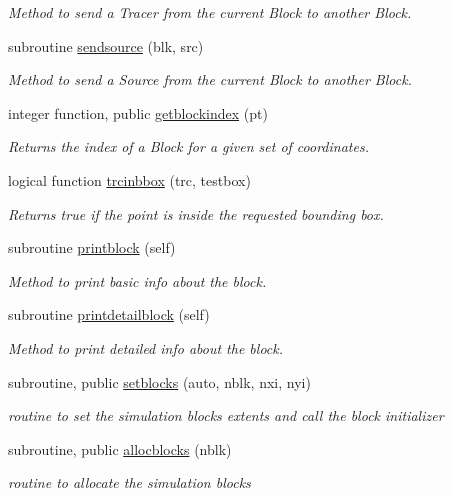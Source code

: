 \begin{DoxyCompactItemize}
\begin{DoxyCompactList}\small\item\em Method to send a Tracer from the current Block to another Block. \end{DoxyCompactList}\item 
subroutine \mbox{\hyperlink{namespaceblocks__mod_a1e632738786730731a48d9a432f6ab84}{sendsource}} (blk, src)
\begin{DoxyCompactList}\small\item\em Method to send a Source from the current Block to another Block. \end{DoxyCompactList}\item 
integer function, public \mbox{\hyperlink{namespaceblocks__mod_a62e8fb0d6b2535b4499c7a4d848c24ba}{getblockindex}} (pt)
\begin{DoxyCompactList}\small\item\em Returns the index of a Block for a given set of coordinates. \end{DoxyCompactList}\item 
logical function \mbox{\hyperlink{namespaceblocks__mod_a101d0a23b5b56baf6e5bd35bc7b677b0}{trcinbbox}} (trc, testbox)
\begin{DoxyCompactList}\small\item\em Returns true if the point is inside the requested bounding box. \end{DoxyCompactList}\item 
subroutine \mbox{\hyperlink{namespaceblocks__mod_a6eab8b323cb15dcecb5c6b0c31b4e246}{printblock}} (self)
\begin{DoxyCompactList}\small\item\em Method to print basic info about the block. \end{DoxyCompactList}\item 
subroutine \mbox{\hyperlink{namespaceblocks__mod_a10f356706988c45a255922fe70851488}{printdetailblock}} (self)
\begin{DoxyCompactList}\small\item\em Method to print detailed info about the block. \end{DoxyCompactList}\item 
subroutine, public \mbox{\hyperlink{namespaceblocks__mod_a8f5a5d9e6cfd16cfd1b179092a204696}{setblocks}} (auto, nblk, nxi, nyi)
\begin{DoxyCompactList}\small\item\em routine to set the simulation blocks extents and call the block initializer \end{DoxyCompactList}\item 
subroutine, public \mbox{\hyperlink{namespaceblocks__mod_a639beb0fee2290d46353f4b4702d6711}{allocblocks}} (nblk)
\begin{DoxyCompactList}\small\item\em routine to allocate the simulation blocks \end{DoxyCompactList}\end{DoxyCompactItemize}
